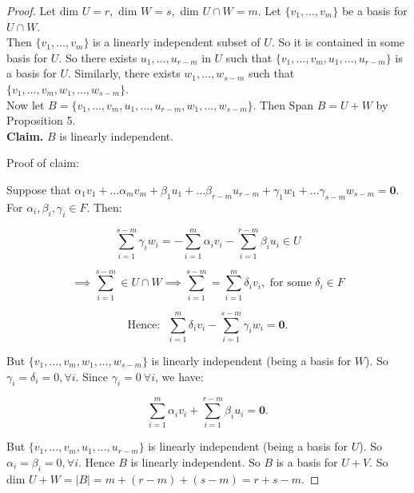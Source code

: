 \documentclass[twoside]{scrartcl}
\begin{document}
\begin{proof}
Let dim $U = r, $ dim $W = s, $ dim $U \cap W = m$. Let $\{v_1, \dots, v_m\}$ be a basis for $U \cap W$.\\

Then $\{v_1,\dots,v_m\}$ is a linearly independent subset of $U$. So it is contained in some basis for $U$. So there exists $u_1,\dots, u_{r-m}$ in $U$ such that $\{v_1,\dots,v_m,u_1,\dots,u_{r-m}\}$ is a basis for $U$. Similarly, there exists $w_1,\dots,w_{s-m}$ such that $\{v_1,\dots,v_m,w_1,\dots,w_{s-m}\}$.\\


Now let $B = \{v_1,\dots,v_m,u_1,\dots,u_{r-m},w_1,\dots,w_{s-m}\}$. Then Span $B = U + W$ by Proposition 5.\\

\textbf{Claim.} $B$ is linearly independent.

Proof of claim:

Suppose that $\alpha_1v_1 + \dots \alpha_mv_m + \beta_1u_1 + \dots \beta_{r-m}u_{r-m} + \gamma_1w_1 + \dots \gamma_{s-m}w_{s-m} = \mathbf{0}.$ For $\alpha_i, \beta_i, \gamma_i \in F$. Then:

\[\sum_{i=1}^{s-m} \gamma_iw_i = -\sum_{i = 1}^{m} \alpha_iv_i - \sum_{i=1}^{r-m} \beta_iu_i \in U \]

\[\implies \sum_{i=1}^{s-m} \in U \cap W \implies \sum_{i=1}^{s-m} = \sum_{i=1}^{m} \delta_iv_i, \text{ for some } \delta_i \in F\]

\[\text{Hence:~ }\sum_{i=1}^{m} \delta_iv_i - \sum_{i=1}^{s-m} \gamma_iw_i = \mathbf{0}.\]

But $\{v_1,\dots,v_m,w_1,\dots,w_{s-m}\}$ is linearly independent (being a basis for $W$). So $\gamma_i =\delta_i = 0, \forall i$. Since $\gamma_i = 0 ~\forall i$, we have:

\[\sum_{i=1}^{m} \alpha_iv_i + \sum_{i=1}^{r-m} \beta_iu_i = \mathbf{0}.\]
 
 But $\{v_1,\dots,v_m,u_1,\dots,u_{r-m}\}$ is linearly independent (being a basis for $U$). So $\alpha_i =\beta_i = 0, \forall i$. Hence $B$ is linearly independent. So $B$ is a basis for $U+V$. So dim $U + W = |B| = m + (r-m) + (s-m) = r + s - m$.
\end{proof}\vspace*{10pt}
 
\end{document}
